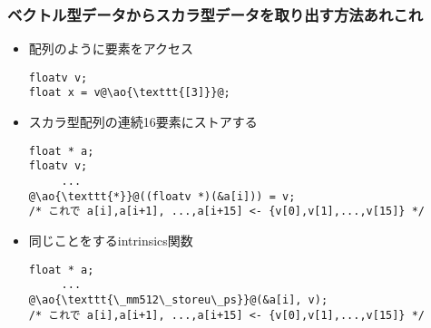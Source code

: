 \documentclass[10pt,dvipdfmx]{beamer}
\newcommand{\ao}[1]{{\color{blue}#1}}
\begin{document}
\iffalse
\begin{frame}[fragile]
\frametitle{ベクトル型データからスカラ型データを取り出す方法あれこれ}
\begin{itemize}
\item 配列風の構文
\begin{lstlisting}
floatv v;
float x = v@\ao{\texttt{[3]}}@;
\end{lstlisting}

\item スカラ型配列の連続8要素にストアする
\begin{lstlisting}
float * a;
floatv v;
     ...
@\ao{\texttt{*}}@((floatv *)(&a[i])) = v;
/* これで a[i],a[i+1], ...,a[i+7] <- {v[0],v[1],...,v[7]} */
\end{lstlisting}

\item 同じことを関数で
\begin{lstlisting}
float * a;
     ...
@\ao{\texttt{\_mm256\_store\_ps}}@(&a[i], v);
@\ao{\texttt{\_mm256\_storeu\_ps}}@(&a[i], v);
/* これで a[i],a[i+1], ...,a[i+7] <- {v[0],v[1],...,v[7]} */
\end{lstlisting}
\end{itemize}
\end{frame}
\fi

\begin{frame}[fragile]
\frametitle{ベクトル型データからスカラ型データを取り出す方法あれこれ}
\begin{itemize}
\item 配列のように要素をアクセス
\begin{lstlisting}
floatv v;
float x = v@\ao{\texttt{[3]}}@;
\end{lstlisting}

\item スカラ型配列の連続16要素にストアする
\begin{lstlisting}
float * a;
floatv v;
     ...
@\ao{\texttt{*}}@((floatv *)(&a[i])) = v;
/* これで a[i],a[i+1], ...,a[i+15] <- {v[0],v[1],...,v[15]} */
\end{lstlisting}

\item 同じことをするintrinsics関数
\begin{lstlisting}
float * a;
     ...
@\ao{\texttt{\_mm512\_storeu\_ps}}@(&a[i], v);
/* これで a[i],a[i+1], ...,a[i+15] <- {v[0],v[1],...,v[15]} */
\end{lstlisting}
\end{itemize}
\end{frame}
\end{document}
